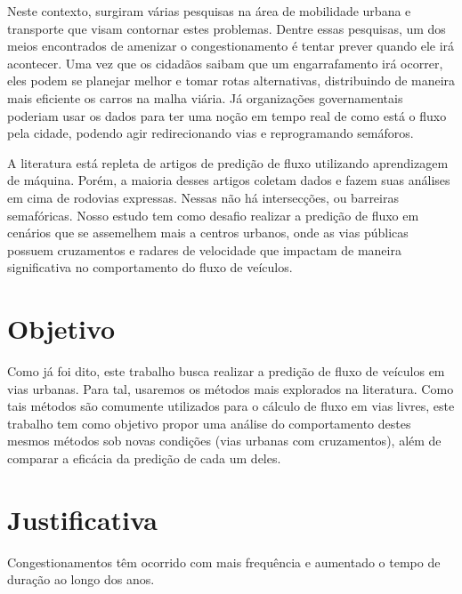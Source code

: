 Neste contexto, surgiram várias pesquisas na área de mobilidade urbana e transporte que visam contornar estes problemas. Dentre essas pesquisas, um dos meios encontrados de amenizar o congestionamento é tentar prever quando ele irá acontecer. Uma vez que os cidadãos saibam que um engarrafamento irá ocorrer, eles podem se planejar melhor e tomar rotas alternativas, distribuindo de maneira mais eficiente os carros na malha viária. Já organizações governamentais poderiam usar os dados para ter uma noção em tempo real de como está o fluxo pela cidade, podendo agir redirecionando vias e reprogramando semáforos.

A literatura está repleta de artigos de predição de fluxo utilizando aprendizagem de máquina. Porém, a maioria desses artigos coletam dados e fazem suas análises em cima de rodovias expressas. Nessas não há intersecções, ou barreiras semafóricas. Nosso estudo tem como desafio realizar a predição de fluxo em cenários que se assemelhem mais a centros urbanos, onde as vias públicas possuem cruzamentos e radares de velocidade que impactam de maneira significativa no comportamento do fluxo de veículos.

\section{Objetivo}

Como já foi dito, este trabalho busca realizar a predição de fluxo de veículos em vias urbanas. Para tal, usaremos os métodos mais explorados na literatura. Como tais métodos são comumente utilizados para o cálculo de fluxo em vias livres, este trabalho tem como objetivo propor uma análise do comportamento destes mesmos métodos sob novas condições (vias urbanas com cruzamentos), além de comparar a eficácia da predição de cada um deles.
 
\section{Justificativa}



Congestionamentos têm ocorrido com mais frequência e aumentado o tempo de duração ao longo dos anos. 


